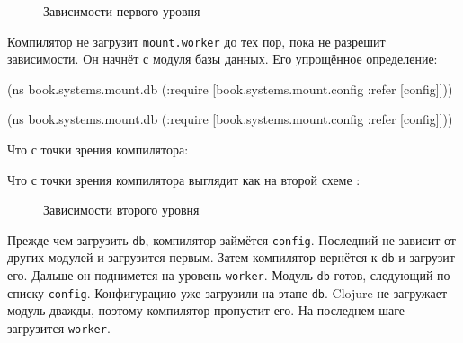 \begin{figure}[ht!]
  \caption{Зависимости первого уровня}
  \label{fig:chart-sys-2}
\end{figure}

\fi

Компилятор не загрузит \verb|mount.worker| до тех пор, пока не разрешит
зависимости. Он начнёт с модуля базы данных. Его упрощённое определение:

\ifnarrow

\begin{english}
  \begin{clojure}
(ns book.systems.mount.db
  (:require
   [book.systems.mount.config
    :refer [config]]))
  \end{clojure}
\end{english}

\else

\begin{english}
  \begin{clojure}
(ns book.systems.mount.db
  (:require
   [book.systems.mount.config :refer [config]]))
  \end{clojure}
\end{english}

\fi

\ifprint

\noindent
Что с точки зрения компилятора:

\begin{figure}[h!]
\end{figure}

\fi

\ifebook

\noindent
Что с точки зрения компилятора выглядит как на второй схеме
:

\begin{figure}[b!]
  \caption{Зависимости второго уровня}
  \label{fig:chart-sys-3}
\end{figure}

\fi

Прежде чем загрузить \verb|db|, компилятор займётся \verb|config|. Последний
не зависит от других модулей и загрузится первым. Затем компилятор вернётся к
\verb|db| и загрузит его. Дальше он поднимется на уровень
\verb|worker|. Модуль \verb|db| готов, следующий по списку
\verb|config|. Конфигурацию уже загрузили на этапе \verb|db|. Clojure не
загружает модуль дважды, поэтому компилятор пропустит его. На последнем шаге
загрузится \verb|worker|.

